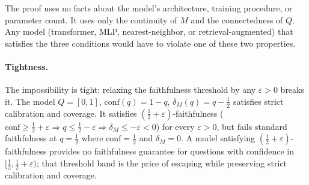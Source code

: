 \documentclass[10pt]{article}
\newcommand{\conf}{\mathrm{conf}}
\begin{document}
The proof uses no facts about the model's architecture, training
procedure, or parameter count. It uses only the continuity of $M$ and
the connectedness of $Q$. Any model (transformer, MLP, nearest-neighbor,
or retrieval-augmented) that satisfies the three conditions would have to
violate one of these two properties.

\paragraph{Tightness.}
\label{par:tightness}
The impossibility is tight: relaxing the faithfulness threshold by any
$\varepsilon > 0$ breaks it. The model $Q = [0,1]$, $\conf(q) = 1-q$,
$\delta_M(q) = q - \tfrac{1}{2}$ satisfies strict calibration and
coverage. It satisfies $(\tfrac{1}{2}+\varepsilon)$-faithfulness
($\conf \geq \tfrac{1}{2}+\varepsilon \Rightarrow q \leq
\tfrac{1}{2}-\varepsilon \Rightarrow \delta_M \leq -\varepsilon < 0$)
for every $\varepsilon > 0$, but fails standard faithfulness at $q =
\tfrac{1}{2}$ where $\conf = \tfrac{1}{2}$ and $\delta_M = 0$.
A model satisfying $(\tfrac{1}{2}+\varepsilon)$-faithfulness provides no
faithfulness guarantee for questions with confidence in
$[\tfrac{1}{2},\tfrac{1}{2}+\varepsilon)$; that threshold band is the price
of escaping while preserving strict calibration and coverage.
\end{document}
